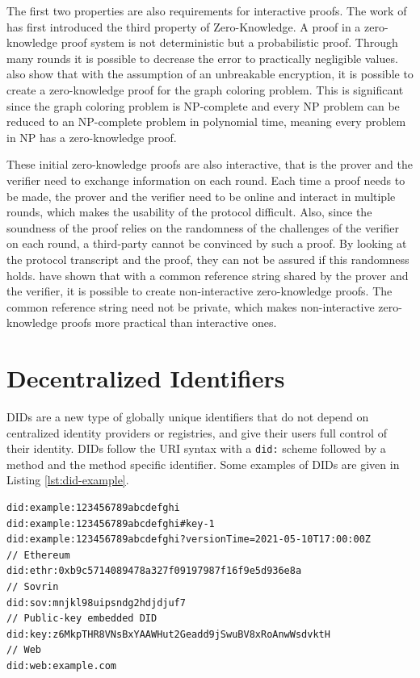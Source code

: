 The first two properties are also requirements for interactive proofs. The work of \cite{Goldwasser.1985} has first introduced the third property of Zero-Knowledge. A proof in a zero-knowledge proof system is not deterministic but a probabilistic proof. Through many rounds it is possible to decrease the error to practically negligible values. \cite{Goldreich.1991} also show that with the assumption of an unbreakable encryption, it is possible to create a zero-knowledge proof for the graph coloring problem. This is significant since the graph coloring problem is NP-complete and every NP problem can be reduced to an NP-complete problem in polynomial time, meaning every problem in NP has a zero-knowledge proof. 

These initial zero-knowledge proofs are also interactive, that is the prover and the verifier need to exchange information on each round. Each time a proof needs to be made, the prover and the verifier need to be online and interact in multiple rounds, which makes the usability of the protocol difficult. Also, since the soundness of the proof relies on the randomness of the challenges of the verifier on each round, a third-party cannot be convinced by such a proof. By looking at the protocol transcript and the proof, they can not be assured if this randomness holds. \cite{Blum.1988} have shown that with a common reference string shared by the prover and the verifier, it is possible to create non-interactive zero-knowledge proofs. The common reference string need not be private, which makes non-interactive zero-knowledge proofs more practical than interactive ones.


\section{Decentralized Identifiers}

\acrfull{DID}s \parencite{reed_sporny_longley_allen_grant_sabadello_2021} are a new type of globally unique identifiers that do not depend on centralized identity providers or registries, and give their users full control of their identity. \acrshort{DID}s follow the \acrshort{URI} syntax with a \lstinline{did:} scheme followed by a method and the method specific identifier. Some examples of \acrshort{DID}s are given in Listing \ref{lst:did-example}.

\begin{lstlisting}[label={lst:did-example}, caption={\acrlong{DID} examples}]
did:example:123456789abcdefghi
did:example:123456789abcdefghi#key-1
did:example:123456789abcdefghi?versionTime=2021-05-10T17:00:00Z
// Ethereum 
did:ethr:0xb9c5714089478a327f09197987f16f9e5d936e8a
// Sovrin
did:sov:mnjkl98uipsndg2hdjdjuf7
// Public-key embedded DID
did:key:z6MkpTHR8VNsBxYAAWHut2Geadd9jSwuBV8xRoAnwWsdvktH
// Web
did:web:example.com
\end{lstlisting}

